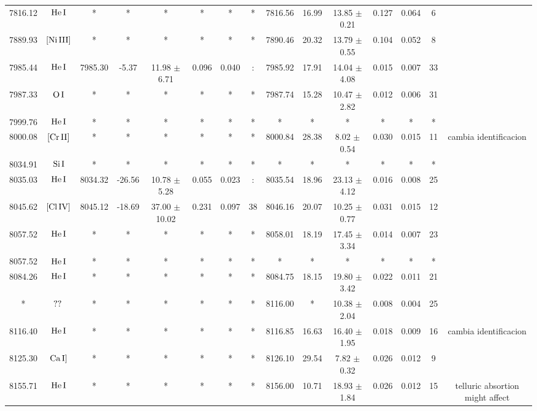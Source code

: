 \documentclass{article}
\begin{document}
\begin{table*}
\begin{adjustbox}{width=\textwidth}
\begin{tabular}{ccccccccccccccc}
7816.12 & $\mbox{He}\thinspace \mbox{I}$ & * & * & * & * & * & * & 7816.56 & 16.99 & 13.85 $\pm$ 0.21 & 0.127 & 0.064 & 6 &  \\
7889.93 & $\mbox{[Ni}\thinspace \mbox{III]}$ & * & * & * & * & * & * & 7890.46 & 20.32 & 13.79 $\pm$ 0.55 & 0.104 & 0.052 & 8 &  \\
7985.44 & $\mbox{He}\thinspace \mbox{I}$ & 7985.30 & -5.37 & 11.98 $\pm$ 6.71 & 0.096 & 0.040 & : & 7985.92 & 17.91 & 14.04 $\pm$ 4.08 & 0.015 & 0.007 & 33 &  \\
7987.33 & $\mbox{O}\thinspace \mbox{I}$ & * & * & * & * & * & * & 7987.74 & 15.28 & 10.47 $\pm$ 2.82 & 0.012 & 0.006 & 31 &  \\
7999.76 & $\mbox{He}\thinspace \mbox{I}$ & * & * & * & * & * & * & * & * & * & * & * & * &  \\
8000.08 & $\mbox{[Cr}\thinspace \mbox{II]}$ & * & * & * & * & * & * & 8000.84 & 28.38 & 8.02 $\pm$ 0.54 & 0.030 & 0.015 & 11 &  cambia identificacion \\
8034.91 & $\mbox{Si}\thinspace \mbox{I}$ & * & * & * & * & * & * & * & * & * & * & * & * &  \\
8035.03 & $\mbox{He}\thinspace \mbox{I}$ & 8034.32 & -26.56 & 10.78 $\pm$ 5.28 & 0.055 & 0.023 & : & 8035.54 & 18.96 & 23.13 $\pm$ 4.12 & 0.016 & 0.008 & 25 &  \\
8045.62 & $\mbox{[Cl}\thinspace \mbox{IV]}$ & 8045.12 & -18.69 & 37.00 $\pm$ 10.02 & 0.231 & 0.097 & 38 & 8046.16 & 20.07 & 10.25 $\pm$ 0.77 & 0.031 & 0.015 & 12 &  \\
8057.52 & $\mbox{He}\thinspace \mbox{I}$ & * & * & * & * & * & * & 8058.01 & 18.19 & 17.45 $\pm$ 3.34 & 0.014 & 0.007 & 23 &  \\
8057.52 & $\mbox{He}\thinspace \mbox{I}$ & * & * & * & * & * & * & * & * & * & * & * & * &  \\
8084.26 & $\mbox{He}\thinspace \mbox{I}$ & * & * & * & * & * & * & 8084.75 & 18.15 & 19.80 $\pm$ 3.42 & 0.022 & 0.011 & 21 &  \\
* & $\mbox{??}\thinspace \mbox{}$ & * & * & * & * & * & * & 8116.00 & * & 10.38 $\pm$ 2.04 & 0.008 & 0.004 & 25 &  \\
8116.40 & $\mbox{He}\thinspace \mbox{I}$ & * & * & * & * & * & * & 8116.85 & 16.63 & 16.40 $\pm$ 1.95 & 0.018 & 0.009 & 16 &  cambia identificacion \\
8125.30 & $\mbox{Ca}\thinspace \mbox{I]}$ & * & * & * & * & * & * & 8126.10 & 29.54 & 7.82 $\pm$ 0.32 & 0.026 & 0.012 & 9 &  \\
8155.71 & $\mbox{He}\thinspace \mbox{I}$ & * & * & * & * & * & * & 8156.00 & 10.71 & 18.93 $\pm$ 1.84 & 0.026 & 0.012 & 15 &  telluric absortion might affect \\

\end{tabular}
\end{adjustbox}
\end{table*}
\end{document}
